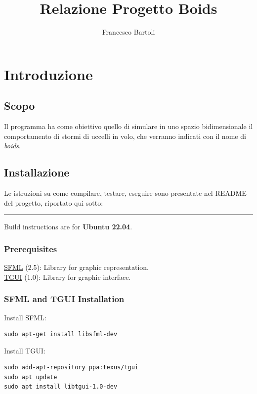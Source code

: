 \documentclass[10pt,a4paper]{article}
\title{Relazione Progetto Boids}
\author{Francesco Bartoli}
\date{}
\begin{document}
\maketitle

\tableofcontents

\setlength{\parindent}{0pt}


\section{Introduzione}
\subsection{Scopo}
Il programma ha come obiettivo quello di simulare in uno spazio bidimensionale il comportamento di stormi di uccelli in volo, che verranno indicati con il nome di \textit{boids}. 

\subsection{Installazione}

Le istruzioni su come compilare, testare, eseguire sono presentate nel README del progetto, riportato qui sotto:

\par\noindent\rule{\textwidth}{0.4pt}

Build instructions are for \textbf{Ubuntu 22.04}.

\subsubsection{Prerequisites}

\href{https://github.com/SFML/SFML}{SFML} (2.5): Library for graphic representation. \\
\href{https://github.com/texus/TGUI}{TGUI} (1.0): Library for graphic interface.

\subsubsection{SFML and TGUI Installation}

Install SFML:

\begin{lstlisting}
sudo apt-get install libsfml-dev
\end{lstlisting}

Install TGUI:

\begin{lstlisting}
sudo add-apt-repository ppa:texus/tgui
sudo apt update
sudo apt install libtgui-1.0-dev
\end{lstlisting}
\end{document}
